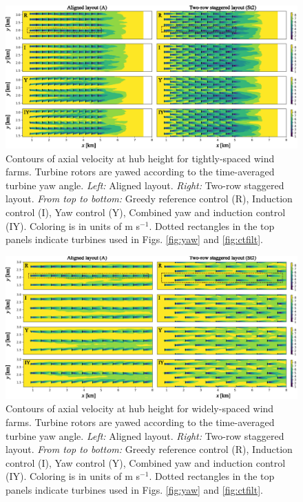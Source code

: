 \documentclass[a4paper]{jpconf}
\begin{document}
\begin{figure}[t]
	\includegraphics[width=\textwidth]{Torque18/tight_stat}
	\caption{Contours of axial velocity at hub height for tightly-spaced wind farms. Turbine rotors are yawed according to the time-averaged turbine yaw angle. \emph{Left: } Aligned layout. \emph{Right: } Two-row staggered layout. \emph{From top to bottom:} Greedy reference control (R), Induction control (I), Yaw control (Y), Combined yaw and induction control (IY). Coloring is in units of m s$^{-1}$. Dotted rectangles in the top panels indicate turbines used in Figs. \ref{fig:yaw} and \ref{fig:ctfilt}. \label{fig:ax_tight}}
\end{figure}

\begin{figure}[b]
	\includegraphics[width=\textwidth]{Torque18/wide_stat}
	\caption{Contours of axial velocity at hub height for widely-spaced wind farms. Turbine rotors are yawed according to the time-averaged turbine yaw angle. \emph{Left: } Aligned layout. \emph{Right: } Two-row staggered layout. \emph{From top to bottom:} Greedy reference control (R), Induction control (I), Yaw control (Y), Combined yaw and induction control (IY). Coloring is in units of m s$^{-1}$. Dotted rectangles in the top panels indicate turbines used in Figs. \ref{fig:yaw} and \ref{fig:ctfilt}. \label{fig:ax_wide}}	
\end{figure}
\end{document}
